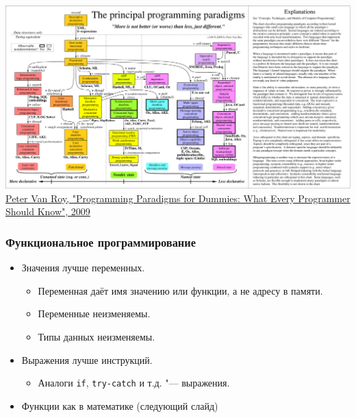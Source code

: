 \documentclass[10pt]{beamer}
\begin{document}
\begin{frame}
\includegraphics[trim={0 0 144mm -2mm},clip,width=\textwidth,height=\textheight,keepaspectratio]{paradigmsDIAGRAMeng108.pdf}
\footnotesize  \href{https://www.info.ucl.ac.be/~pvr/paradigms.html}{Peter Van Roy, "Programming Paradigms for Dummies: What Every Programmer Should Know", 2009}
\end{frame}

\begin{frame}
\frametitle{Функциональное программирование}
\begin{itemize}
    \item Значения лучше переменных.
    \begin{itemize}
        \item Переменная даёт имя значению или функции, а не адресу в памяти.
        \item Переменные неизменяемы.
        \item Типы данных неизменяемы.
    \end{itemize}
    \item Выражения лучше инструкций.
    \begin{itemize}
        \item Аналоги \lstinline|if|, \lstinline|try-catch| и т.д. "--- выражения.
    \end{itemize}
    \item Функции как в математике (следующий слайд)
\end{itemize}
\end{frame}
\end{document}
